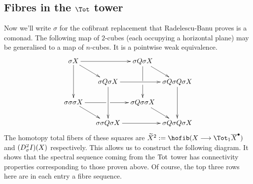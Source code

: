 \documentclass[10pt]{article}
\newcommand{\dupdown}[2]{D^{\smash{#1}}_{\smash{#2}}}
\begin{document}
\begin{convergence}
\subsection{Fibres in the $\Tot$ tower}
Now we'll write $\sigma $ for the cofibrant replacement that Radelescu-Banu proves is a comonad. The following map of $2$-cubes (each occupying a horizontal plane) may be generalised to a map of $n$-cubes. It is a pointwise weak equivalence.
\[\def\labelstyle{\scriptstyle}
\xymatrix@!0@R=30pt@C=50pt{
\sigma X \ar[rr]\ar[rd]\ar[dd]         &           &   \sigma Q\sigma X \ar'[d][dd]           \ar[dr]  &                  \\
 &  \sigma Q\sigma X \ar[rr] \ar[dd]  &             & \sigma Q\sigma Q\sigma X
         \ar[dd] \\
\sigma \sigma \sigma X \ar'[r][rr] \ar[dr] &        &   \sigma Q\sigma \sigma X
\ar[dr] &                   \\
           &   \sigma \sigma Q\sigma X \ar[rr]      &                    &
\sigma Q\sigma Q\sigma X
}\]
The homotopy total fibers of these squares are $\widetilde{X}^2:=\hofib(X\to \Tot_1\overline{X}^\bullet)$ and $(\dupdown{2}{\sigma} I)(X)$ respectively. This allows us to construct the following diagram. It shows that the spectral sequence coming from the $\textup{Tot}$ tower has connectivity properties corresponding to those proven above. Of course, the top three rows here are in each entry a fibre sequence.

\end{convergence}
\end{document}
